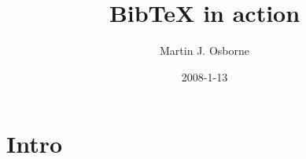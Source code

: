 \documentclass{article}
\begin{document}
\title{BibTeX in action}
\author{Martin J. Osborne}
\date{2008-1-13}

\maketitle
\section{Intro}
\cite{transformer}
\cite{NIPS2014_a14ac55a}
\cite{NIPS2015_e995f98d}
\cite{bahdanau2014neural}
\cite{7780459}
\cite{ba2016layer}
\cite{GoodBengCour16}
\cite{pmlr-v48-oord16}

\end{document}
